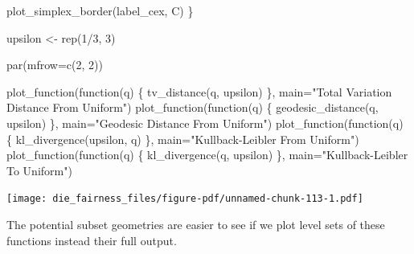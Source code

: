 \documentclass[
  letterpaper,
  DIV=11,
  numbers=noendperiod]{scrartcl}
\newenvironment{Shaded}{\begin{snugshade}}{\end{snugshade}}
\newcommand{\AttributeTok}[1]{\textcolor[rgb]{0.40,0.45,0.13}{#1}}
\newcommand{\ControlFlowTok}[1]{\textcolor[rgb]{0.00,0.23,0.31}{#1}}
\newcommand{\DecValTok}[1]{\textcolor[rgb]{0.68,0.00,0.00}{#1}}
\newcommand{\FunctionTok}[1]{\textcolor[rgb]{0.28,0.35,0.67}{#1}}
\newcommand{\NormalTok}[1]{\textcolor[rgb]{0.00,0.23,0.31}{#1}}
\newcommand{\OtherTok}[1]{\textcolor[rgb]{0.00,0.23,0.31}{#1}}
\newcommand{\SpecialCharTok}[1]{\textcolor[rgb]{0.37,0.37,0.37}{#1}}
\newcommand{\StringTok}[1]{\textcolor[rgb]{0.13,0.47,0.30}{#1}}
\begin{document}
\begin{Shaded}
\begin{Highlighting}[]
  \FunctionTok{plot\_simplex\_border}\NormalTok{(label\_cex, C)}
\NormalTok{\}}
\end{Highlighting}
\end{Shaded}

\begin{Shaded}
\begin{Highlighting}[]
\NormalTok{upsilon }\OtherTok{\textless{}{-}} \FunctionTok{rep}\NormalTok{(}\DecValTok{1}\SpecialCharTok{/}\DecValTok{3}\NormalTok{, }\DecValTok{3}\NormalTok{)}

\FunctionTok{par}\NormalTok{(}\AttributeTok{mfrow=}\FunctionTok{c}\NormalTok{(}\DecValTok{2}\NormalTok{, }\DecValTok{2}\NormalTok{))}

\FunctionTok{plot\_function}\NormalTok{(}\ControlFlowTok{function}\NormalTok{(q) \{ }\FunctionTok{tv\_distance}\NormalTok{(q, upsilon) \},}
              \AttributeTok{main=}\StringTok{"Total Variation Distance From Uniform"}\NormalTok{)}
\FunctionTok{plot\_function}\NormalTok{(}\ControlFlowTok{function}\NormalTok{(q) \{ }\FunctionTok{geodesic\_distance}\NormalTok{(q, upsilon) \},}
              \AttributeTok{main=}\StringTok{"Geodesic Distance From Uniform"}\NormalTok{)}
\FunctionTok{plot\_function}\NormalTok{(}\ControlFlowTok{function}\NormalTok{(q) \{ }\FunctionTok{kl\_divergence}\NormalTok{(upsilon, q) \},}
              \AttributeTok{main=}\StringTok{"Kullback{-}Leibler From Uniform"}\NormalTok{)}
\FunctionTok{plot\_function}\NormalTok{(}\ControlFlowTok{function}\NormalTok{(q) \{ }\FunctionTok{kl\_divergence}\NormalTok{(q, upsilon) \},}
              \AttributeTok{main=}\StringTok{"Kullback{-}Leibler To Uniform"}\NormalTok{)}
\end{Highlighting}
\end{Shaded}

\texttt{[image: die\_fairness\_files/figure-pdf/unnamed-chunk-113-1.pdf]}

The potential subset geometries are easier to see if we plot level sets
of these functions instead their full output.
\end{document}
